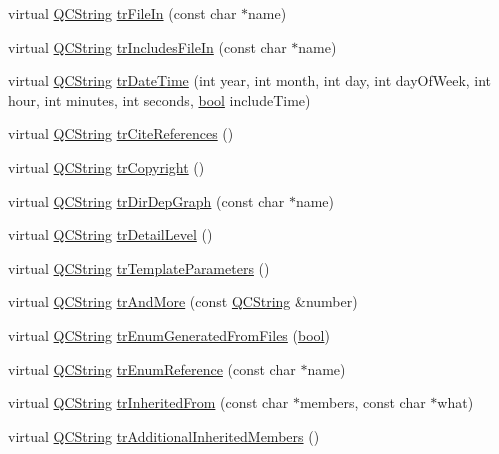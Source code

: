 \begin{DoxyCompactItemize}
\item 
virtual \hyperlink{class_q_c_string}{Q\+C\+String} \hyperlink{class_translator_chinese_a4369da42391439eb5bb2318d2a0211f8}{tr\+File\+In} (const char $\ast$name)
\item 
virtual \hyperlink{class_q_c_string}{Q\+C\+String} \hyperlink{class_translator_chinese_abaf5291e2c4297cd07a482ab756a6401}{tr\+Includes\+File\+In} (const char $\ast$name)
\item 
virtual \hyperlink{class_q_c_string}{Q\+C\+String} \hyperlink{class_translator_chinese_a9440bfa8100d9e24f0db13310978cd25}{tr\+Date\+Time} (int year, int month, int day, int day\+Of\+Week, int hour, int minutes, int seconds, \hyperlink{qglobal_8h_a1062901a7428fdd9c7f180f5e01ea056}{bool} include\+Time)
\item 
virtual \hyperlink{class_q_c_string}{Q\+C\+String} \hyperlink{class_translator_chinese_aa3bc2248a7f54c1b56d2b584b22de519}{tr\+Cite\+References} ()
\item 
virtual \hyperlink{class_q_c_string}{Q\+C\+String} \hyperlink{class_translator_chinese_a1623339d1e43357b1ba21f58a3382d43}{tr\+Copyright} ()
\item 
virtual \hyperlink{class_q_c_string}{Q\+C\+String} \hyperlink{class_translator_chinese_a6fd55ce82e675b31fc8c55c0b99c22a9}{tr\+Dir\+Dep\+Graph} (const char $\ast$name)
\item 
virtual \hyperlink{class_q_c_string}{Q\+C\+String} \hyperlink{class_translator_chinese_a03397b2ca00484884f7fb9be9d666d03}{tr\+Detail\+Level} ()
\item 
virtual \hyperlink{class_q_c_string}{Q\+C\+String} \hyperlink{class_translator_chinese_a96ac34d4daa866df229b70296b424a6b}{tr\+Template\+Parameters} ()
\item 
virtual \hyperlink{class_q_c_string}{Q\+C\+String} \hyperlink{class_translator_chinese_a2fe16181d57a63bf65b59900e92dd434}{tr\+And\+More} (const \hyperlink{class_q_c_string}{Q\+C\+String} \&number)
\item 
virtual \hyperlink{class_q_c_string}{Q\+C\+String} \hyperlink{class_translator_chinese_aee5fca73a548ac964fc4869d5915ff10}{tr\+Enum\+Generated\+From\+Files} (\hyperlink{qglobal_8h_a1062901a7428fdd9c7f180f5e01ea056}{bool})
\item 
virtual \hyperlink{class_q_c_string}{Q\+C\+String} \hyperlink{class_translator_chinese_ac41690f621caef07e515d2cd8e58392e}{tr\+Enum\+Reference} (const char $\ast$name)
\item 
virtual \hyperlink{class_q_c_string}{Q\+C\+String} \hyperlink{class_translator_chinese_a595215852c20040eca3c8e890f986da1}{tr\+Inherited\+From} (const char $\ast$members, const char $\ast$what)
\item 
virtual \hyperlink{class_q_c_string}{Q\+C\+String} \hyperlink{class_translator_chinese_a2bfe5184a9fd92092081ef544ea865f5}{tr\+Additional\+Inherited\+Members} ()
\end{DoxyCompactItemize}
